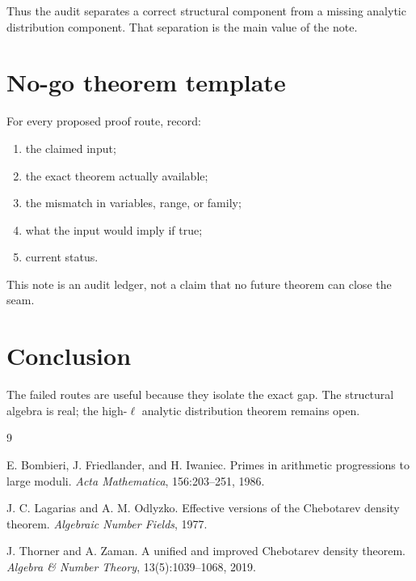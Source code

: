 \documentclass[11pt]{article}
\newcommand{\1}{\mathbf 1}
\begin{document}
Thus the audit separates a correct structural component from a missing analytic distribution component.  That separation is the main value of the note.


\section{No-go theorem template}

For every proposed proof route, record:
\begin{enumerate}[leftmargin=1.5em]
\item the claimed input;
\item the exact theorem actually available;
\item the mismatch in variables, range, or family;
\item what the input would imply if true;
\item current status.
\end{enumerate}
This note is an audit ledger, not a claim that no future theorem can close the seam.

\section{Conclusion}

The failed routes are useful because they isolate the exact gap.  The structural algebra is real; the high-\(\ell\) analytic distribution theorem remains open.


\begin{thebibliography}{9}

E. Bombieri, J. Friedlander, and H. Iwaniec.
\newblock Primes in arithmetic progressions to large moduli.
\newblock \emph{Acta Mathematica}, 156:203--251, 1986.

J. C. Lagarias and A. M. Odlyzko.
\newblock Effective versions of the Chebotarev density theorem.
\newblock \emph{Algebraic Number Fields}, 1977.

J. Thorner and A. Zaman.
\newblock A unified and improved Chebotarev density theorem.
\newblock \emph{Algebra \& Number Theory}, 13(5):1039--1068, 2019.

\end{thebibliography}
\end{document}
